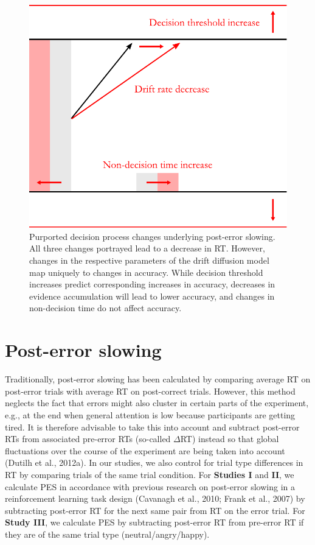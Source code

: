 \documentclass[12pt,openany]{book}
\theoremstyle{definition}
\theoremstyle{definition}
\theoremstyle{definition}
\theoremstyle{remark}
\begin{document}
\begin{figure}
\centering
\includegraphics[height=0.80000\textwidth]{./figures/ddm_PES_changes.pdf}
\caption{Purported decision process changes underlying post-error
slowing. All three changes portrayed lead to a decrease in RT. However,
changes in the respective parameters of the drift diffusion model map
uniquely to changes in accuracy. While decision threshold increases
predict corresponding increases in accuracy, decreases in evidence
accumulation will lead to lower accuracy, and changes in non-decision
time do not affect accuracy.\label{fig_ddm_pes_changes}}
\end{figure}

\section{Post-error slowing}\label{post-error-slowing}

Traditionally, post-error slowing has been calculated by comparing
average RT on post-error trials with average RT on post-correct trials.
However, this method neglects the fact that errors might also cluster in
certain parts of the experiment, e.g., at the end when general attention
is low because participants are getting tired. It is therefore advisable
to take this into account and subtract post-error RTs from associated
pre-error RTs (so-called \(\Delta\)RT) instead so that global
fluctuations over the course of the experiment are being taken into
account (Dutilh et al., 2012a). In our studies, we also control for
trial type differences in RT by comparing trials of the same trial
condition. For \textbf{Studies I} and \textbf{II}, we calculate PES in
accordance with previous research on post-error slowing in a
reinforcement learning task design (Cavanagh et al., 2010; Frank et al.,
2007) by subtracting post-error RT for the next same pair from RT on the
error trial. For \textbf{Study III}, we calculate PES by subtracting
post-error RT from pre-error RT if they are of the same trial type
(neutral/angry/happy).
\end{document}
